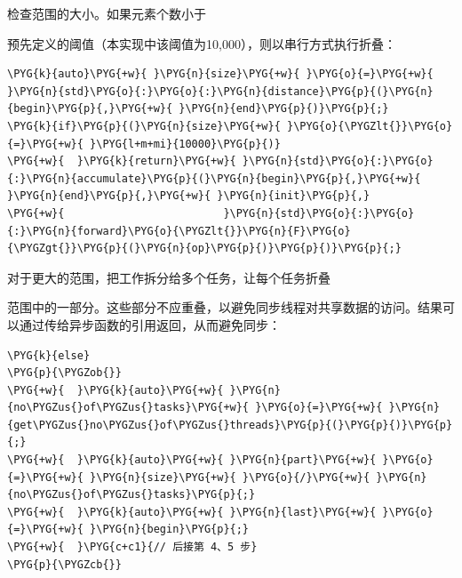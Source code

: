 
检查范围的大小。如果元素个数小于



预先定义的阈值（本实现中该阈值为10,000），则以串行方式执行折叠：



\begin{codeblockbg}
\begin{Verbatim}[commandchars=\\\{\},breaklines=true,breakanywhere=true,fontsize=\codefont,xleftmargin=17bp]
\PYG{k}{auto}\PYG{+w}{ }\PYG{n}{size}\PYG{+w}{ }\PYG{o}{=}\PYG{+w}{ }\PYG{n}{std}\PYG{o}{:}\PYG{o}{:}\PYG{n}{distance}\PYG{p}{(}\PYG{n}{begin}\PYG{p}{,}\PYG{+w}{ }\PYG{n}{end}\PYG{p}{)}\PYG{p}{;}
\PYG{k}{if}\PYG{p}{(}\PYG{n}{size}\PYG{+w}{ }\PYG{o}{\PYGZlt{}}\PYG{o}{=}\PYG{+w}{ }\PYG{l+m+mi}{10000}\PYG{p}{)}
\PYG{+w}{  }\PYG{k}{return}\PYG{+w}{ }\PYG{n}{std}\PYG{o}{:}\PYG{o}{:}\PYG{n}{accumulate}\PYG{p}{(}\PYG{n}{begin}\PYG{p}{,}\PYG{+w}{ }\PYG{n}{end}\PYG{p}{,}\PYG{+w}{ }\PYG{n}{init}\PYG{p}{,}
\PYG{+w}{                         }\PYG{n}{std}\PYG{o}{:}\PYG{o}{:}\PYG{n}{forward}\PYG{o}{\PYGZlt{}}\PYG{n}{F}\PYG{o}{\PYGZgt{}}\PYG{p}{(}\PYG{n}{op}\PYG{p}{)}\PYG{p}{)}\PYG{p}{;}
\end{Verbatim}
\end{codeblockbg}



对于更大的范围，把工作拆分给多个任务，让每个任务折叠



范围中的一部分。这些部分不应重叠，以避免同步线程对共享数据的访问。结果可以通过传给异步函数的引用返回，从而避免同步：



\begin{codeblockbg}
\begin{Verbatim}[commandchars=\\\{\},breaklines=true,breakanywhere=true,fontsize=\codefont,xleftmargin=17bp]
\PYG{k}{else}
\PYG{p}{\PYGZob{}}
\PYG{+w}{  }\PYG{k}{auto}\PYG{+w}{ }\PYG{n}{no\PYGZus{}of\PYGZus{}tasks}\PYG{+w}{ }\PYG{o}{=}\PYG{+w}{ }\PYG{n}{get\PYGZus{}no\PYGZus{}of\PYGZus{}threads}\PYG{p}{(}\PYG{p}{)}\PYG{p}{;}
\PYG{+w}{  }\PYG{k}{auto}\PYG{+w}{ }\PYG{n}{part}\PYG{+w}{ }\PYG{o}{=}\PYG{+w}{ }\PYG{n}{size}\PYG{+w}{ }\PYG{o}{/}\PYG{+w}{ }\PYG{n}{no\PYGZus{}of\PYGZus{}tasks}\PYG{p}{;}
\PYG{+w}{  }\PYG{k}{auto}\PYG{+w}{ }\PYG{n}{last}\PYG{+w}{ }\PYG{o}{=}\PYG{+w}{ }\PYG{n}{begin}\PYG{p}{;}
\PYG{+w}{  }\PYG{c+c1}{// 后接第 4、5 步}
\PYG{p}{\PYGZcb{}}
\end{Verbatim}
\end{codeblockbg}


